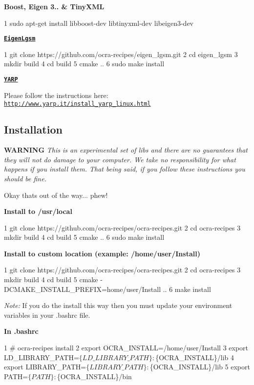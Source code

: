 {\bfseries Boost, Eigen 3.. \& Tiny\+X\+ML} 
\begin{DoxyCode}
1 sudo apt-get install libboost-dev libtinyxml-dev libeigen3-dev
\end{DoxyCode}
 \href{https://github.com/ocra-recipes/eigen_lgsm}{\tt {\bfseries Eigen\+Lgsm}} 
\begin{DoxyCode}
1 git clone https://github.com/ocra-recipes/eigen\_lgsm.git
2 cd eigen\_lgsm
3 mkdir build
4 cd build
5 cmake ..
6 sudo make install
\end{DoxyCode}


\href{http://www.yarp.it}{\tt {\bfseries Y\+A\+RP}}

Please follow the instructions here\+: \href{http://www.yarp.it/install_yarp_linux.html}{\tt http\+://www.\+yarp.\+it/install\+\_\+yarp\+\_\+linux.\+html}

\subsection*{Installation}

{\bfseries W\+A\+R\+N\+I\+NG} {\itshape This is an experimental set of libs and there are no guarantees that they will not do damage to your computer. We take no responsibility for what happens if you install them. That being said, if you follow these instructions you should be fine.}

Okay that\textquotesingle{}s out of the way... phew!

{\bfseries Install to /usr/local} 
\begin{DoxyCode}
1 git clone https://github.com/ocra-recipes/ocra-recipes.git
2 cd ocra-recipes
3 mkdir build
4 cd build
5 cmake ..
6 sudo make install
\end{DoxyCode}


{\bfseries Install to custom location (example\+: /home/user/\+Install)} 
\begin{DoxyCode}
1 git clone https://github.com/ocra-recipes/ocra-recipes.git
2 cd ocra-recipes
3 mkdir build
4 cd build
5 cmake -DCMAKE\_INSTALL\_PREFIX=home/user/Install ..
6 make install
\end{DoxyCode}
 {\itshape Note\+:} If you do the install this way then you must update your environment variables in your {\ttfamily .bashrc} file.

{\bfseries In {\ttfamily .bashrc}} 
\begin{DoxyCode}
1 # ocra-recipes install
2 export OCRA\_INSTALL=/home/user/Install
3 export LD\_LIBRARY\_PATH=$\{LD\_LIBRARY\_PATH\}:$\{OCRA\_INSTALL\}/lib
4 export LIBRARY\_PATH=$\{LIBRARY\_PATH\}:$\{OCRA\_INSTALL\}/lib
5 export PATH=$\{PATH\}:$\{OCRA\_INSTALL\}/bin
\end{DoxyCode}


